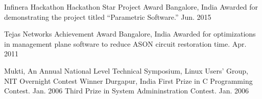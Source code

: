 \begin{cventries}
  \honorentry
    {Infinera Hackathon} %
    {Hackathon Star Project Award} %
    {Bangalore, India}
    {
	\honorsubentry
	  {Awarded for demonstrating the project titled ``Parametric Software.''} %
	  {Jun. 2015} %
    }

  \honorentry
    {Tejas Networks} %
    {Achievement Award} %
    {Bangalore, India}
    {
	\honorsubentry
	  {Awarded for optimizations in management plane software to reduce ASON circuit restoration time.} %
	  {Apr. 2011} %
    }

  \honorentry
    {Mukti, An Annual National Level Technical Symposium, Linux Users' Group, NIT} %
    {Overnight Contest Winner} %
    {Durgapur, India}
    {
	\honorsubentry
	  {First Prize in C Programming Contest.}
	  {Jan. 2006} %
	\honorsubentry
	  {Third Prize in System Admininstration Contest.}
	  {Jan. 2006} %
    }


\end{cventries}


